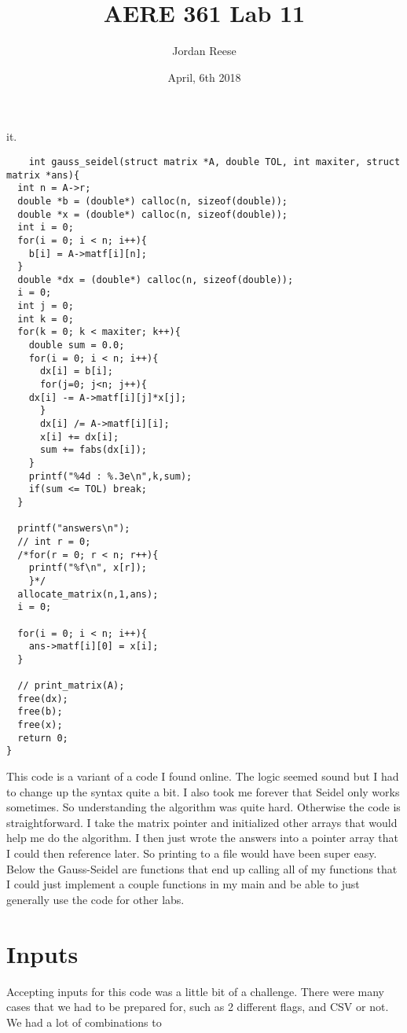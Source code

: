 \documentclass{article} \usepackage[utf8]{inputenc} \title{AERE 361 Lab 11} \author{Jordan Reese} \date{April, 6th 2018} \usepackage{listings} \usepackage{color} \definecolor{dkgreen}{rgb}{0,0.6,0}
\begin{document}
it. \begin{lstlisting}
    int gauss_seidel(struct matrix *A, double TOL, int maxiter, struct matrix *ans){
  int n = A->r;
  double *b = (double*) calloc(n, sizeof(double));
  double *x = (double*) calloc(n, sizeof(double));
  int i = 0;
  for(i = 0; i < n; i++){
    b[i] = A->matf[i][n];
  }
  double *dx = (double*) calloc(n, sizeof(double));
  i = 0;
  int j = 0;
  int k = 0;
  for(k = 0; k < maxiter; k++){
    double sum = 0.0;
    for(i = 0; i < n; i++){
      dx[i] = b[i];
      for(j=0; j<n; j++){
	dx[i] -= A->matf[i][j]*x[j];
      }
      dx[i] /= A->matf[i][i];
      x[i] += dx[i];
      sum += fabs(dx[i]);
    }
    printf("%4d : %.3e\n",k,sum);
    if(sum <= TOL) break;
  }
  
  printf("answers\n");
  // int r = 0;
  /*for(r = 0; r < n; r++){
    printf("%f\n", x[r]);
    }*/
  allocate_matrix(n,1,ans);
  i = 0;
  
  for(i = 0; i < n; i++){
    ans->matf[i][0] = x[i];
  }
 
  // print_matrix(A);
  free(dx);
  free(b);
  free(x);
  return 0;
}
\end{lstlisting} This code is a variant of a code I found online. The logic seemed sound but I had to change up the syntax quite a bit. I also took me forever that Seidel only works sometimes. So understanding the algorithm was 
quite hard. Otherwise the code is straightforward. I take the matrix pointer and initialized other arrays that would help me do the algorithm. I then just wrote the answers into a pointer array that I could then reference later. 
So printing to a file would have been super easy. Below the Gauss-Seidel are functions that end up calling all of my functions that I could just implement a couple functions in my main and be able to just generally use the code 
for other labs. \section*{Inputs} Accepting inputs for this code was a little bit of a challenge. There were many cases that we had to be prepared for, such as 2 different flags, and CSV or not. We had a lot of combinations to 
\end{document}
